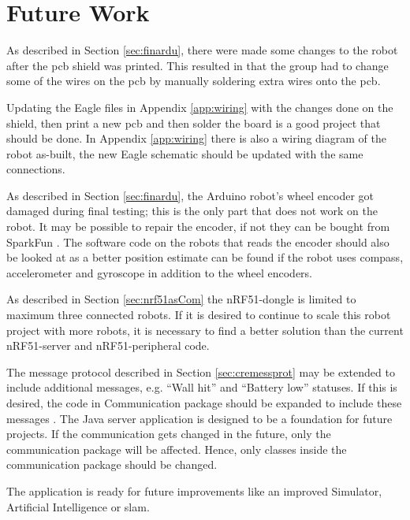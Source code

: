 \chapter{Future Work}
        \label{sec:fwSkjold}
        As described in Section \ref{sec:finardu}, there were made some changes to the robot after the \acrshort{pcb} shield was printed. This resulted in that the group had to change some of the wires on the \acrshort{pcb} by manually soldering extra wires onto the \acrshort{pcb}. 

        Updating the Eagle files in Appendix \ref{app:wiring} with the changes done on the shield, then print a new \acrshort{pcb} and then solder the board is a good project that should be done. In Appendix \ref{app:wiring} there is also a wiring diagram of the robot as-built, the new Eagle schematic should be updated with the same connections.

        As described in Section \ref{sec:finardu}, the Arduino robot's wheel encoder got damaged during final testing; this is the only part that does not work on the robot. It may be possible to repair the encoder, if not they can be bought from SparkFun \cite{sparkfun}. The software code on the robots that reads the encoder should also be looked at as a better position estimate can be found if the robot uses compass, accelerometer and gyroscope in addition to the wheel encoders.

        As described in Section \ref{sec:nrf51asCom} the nRF51-dongle is limited to maximum three connected robots. If it is desired to continue to scale this robot project with more robots, it is necessary to find a better solution than the current nRF51-server and nRF51-peripheral code.

        The message protocol described in Section \ref{sec:cremessprot} may be extended to include additional messages, e.g. ``Wall hit'' and ``Battery low'' statuses. If this is desired, the code in Communication package should be expanded to include these messages
.
        The Java server application is designed to be a foundation for future projects. If the communication gets changed in the future, only the communication package will be affected. Hence, only classes inside the communication package should be changed.

        The application is ready for future improvements like an improved Simulator, Artificial Intelligence or \acrshort{slam}.